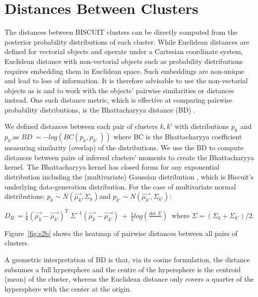 \section{Distances Between Clusters}

The distances between BISCUIT clusters can be directly computed from the posterior probability distributions of each cluster. 
While Euclidean distances are defined for vectorial objects and operate under a Cartesian coordinate system, Euclidean distance with non-vectorial objects such as probability distributions requires embedding them in Euclidean space.
Such embeddings are non-unique and lead to loss of information.
It is therefore advisable to use the non-vectorial objects as is and to work with the objects' pairwise similarities or distances instead.
One such distance metric, which is effective at comparing pairwise probability distributions, is the Bhattacharyya distance (BD) \citep{Bhattacharyya1990}.

We defined distances between each pair of clusters \(k,k'\) with distributions \({p_{k}}^{}\) and \({p_{k'}}^{}\)as \(BD\  = - log(BC({p_{k}}^{},{p_{k'}}^{\ }))\) where \(\text{BC}\) is the Bhattacharyya coefficient measuring similarity (overlap) of the distributions.
We use the BD to compute distances between pairs of inferred clusters' moments to create the Bhattacharyya kernel.
The Bhattacharyya kernel has closed forms for any exponential distribution including the (multivariate) Gaussian distribution \citep{Jebara2004}, which is Biscuit's underlying data-generation distribution.
For the case of multivariate normal distributions: \({p_{k} \sim N(\overrightarrow{\mu_{k}},\Sigma_{k})}^{}\)and \({p_{k'} \sim N(\overrightarrow{\mu_{k'}},\Sigma_{k'})}^{}\):

\(D_{B}\  = \frac{1}{8}(\overrightarrow{\mu_{k}} - \overrightarrow{\mu_{k'}})^{\text{T\ }}\Sigma^{- 1}(\overrightarrow{\mu_{k}} - \overrightarrow{\mu_{k'}})\  + \ \frac{1}{2}log(\frac{\text{det\ }\Sigma}{})\ \) where \(\Sigma = (\Sigma_{k} + \Sigma_{k'})/2\).

Figure~\ref{fig:s2b}  shows the heatmap of pairwise distances between all pairs of
clusters.

A geometric interpretation of BD is that, via its cosine formulation, the distance subsumes a full hypersphere and the centre of the hypersphere is the centroid (mean) of the cluster, whereas the Euclidean distance only covers a quarter of the hypersphere with the center at the origin. %

